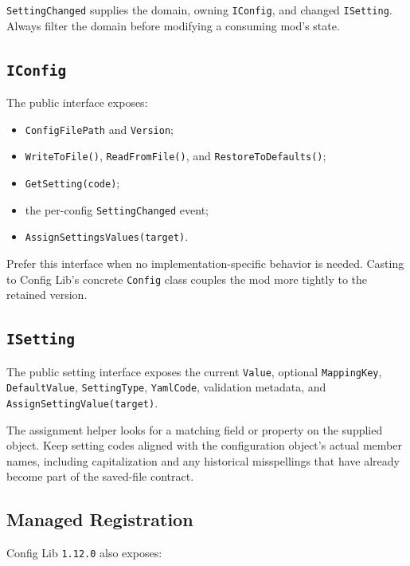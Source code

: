 \documentclass[
  11pt,
  letterpaper,
  titlepage]{article}
\providecommand{\tightlist}{%
  \setlength{\itemsep}{0pt}\setlength{\parskip}{0pt}}
\begin{document}
\texttt{SettingChanged} supplies the domain, owning \texttt{IConfig},
and changed \texttt{ISetting}. Always filter the domain before modifying
a consuming mod's state.

\subsection{\texorpdfstring{\texttt{IConfig}}{IConfig}}\label{iconfig}

The public interface exposes:

\begin{itemize}
\tightlist
\item
  \texttt{ConfigFilePath} and \texttt{Version};
\item
  \texttt{WriteToFile()}, \texttt{ReadFromFile()}, and
  \texttt{RestoreToDefaults()};
\item
  \texttt{GetSetting(code)};
\item
  the per-config \texttt{SettingChanged} event;
\item
  \texttt{AssignSettingsValues(target)}.
\end{itemize}

Prefer this interface when no implementation-specific behavior is
needed. Casting to Config Lib's concrete \texttt{Config} class couples
the mod more tightly to the retained version.

\subsection{\texorpdfstring{\texttt{ISetting}}{ISetting}}\label{isetting}

The public setting interface exposes the current \texttt{Value},
optional \texttt{MappingKey}, \texttt{DefaultValue},
\texttt{SettingType}, \texttt{YamlCode}, validation metadata, and
\texttt{AssignSettingValue(target)}.

The assignment helper looks for a matching field or property on the
supplied object. Keep setting codes aligned with the configuration
object's actual member names, including capitalization and any
historical misspellings that have already become part of the saved-file
contract.

\subsection{Managed Registration}\label{managed-registration}

Config Lib \texttt{1.12.0} also exposes:
\end{document}
